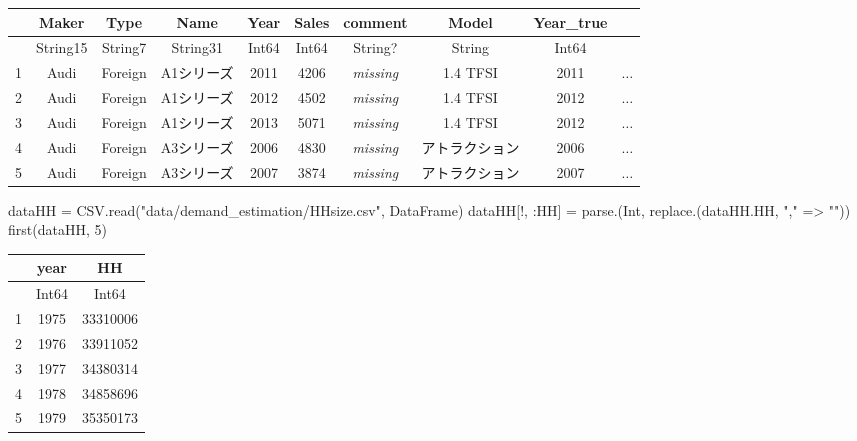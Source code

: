 \documentclass[
  letterpaper,
  DIV=11,
  numbers=noendperiod]{scrreprt}
\newenvironment{Shaded}{\begin{snugshade}}{\end{snugshade}}
\newcommand{\DataTypeTok}[1]{\textcolor[rgb]{0.68,0.00,0.00}{#1}}
\newcommand{\FloatTok}[1]{\textcolor[rgb]{0.68,0.00,0.00}{#1}}
\newcommand{\FunctionTok}[1]{\textcolor[rgb]{0.28,0.35,0.67}{#1}}
\newcommand{\NormalTok}[1]{\textcolor[rgb]{0.00,0.23,0.31}{#1}}
\newcommand{\OperatorTok}[1]{\textcolor[rgb]{0.37,0.37,0.37}{#1}}
\newcommand{\StringTok}[1]{\textcolor[rgb]{0.13,0.47,0.30}{#1}}
\begin{document}
\begin{tabular}{r|ccccccccc}
    & Maker & Type & Name & Year & Sales & comment & Model & Year\_true & \\
    \hline
    & String15 & String7 & String31 & Int64 & Int64 & String? & String & Int64 & \\
    \hline
    1 & Audi & Foreign & A1シリーズ & 2011 & 4206 & \emph{missing} & 1.4 TFSI & 2011 & $\dots$ \\
    2 & Audi & Foreign & A1シリーズ & 2012 & 4502 & \emph{missing} & 1.4 TFSI & 2012 & $\dots$ \\
    3 & Audi & Foreign & A1シリーズ & 2013 & 5071 & \emph{missing} & 1.4 TFSI & 2012 & $\dots$ \\
    4 & Audi & Foreign & A3シリーズ & 2006 & 4830 & \emph{missing} & アトラクション & 2006 & $\dots$ \\
    5 & Audi & Foreign & A3シリーズ & 2007 & 3874 & \emph{missing} & アトラクション & 2007 & $\dots$ \\
\end{tabular}

\begin{Shaded}
\begin{Highlighting}[]
\NormalTok{dataHH }\OperatorTok{=}\NormalTok{ CSV.}\FunctionTok{read}\NormalTok{(}\StringTok{"data/demand\_estimation/HHsize.csv"}\NormalTok{, DataFrame)}
\NormalTok{dataHH[!, }\OperatorTok{:}\NormalTok{HH] }\OperatorTok{=} \FunctionTok{parse}\NormalTok{.(}\DataTypeTok{Int}\NormalTok{, }\FunctionTok{replace}\NormalTok{.(dataHH.HH, }\StringTok{","} \OperatorTok{=\textgreater{}} \StringTok{""}\NormalTok{))}
\FunctionTok{first}\NormalTok{(dataHH, }\FloatTok{5}\NormalTok{)}
\end{Highlighting}
\end{Shaded}

\begin{tabular}{r|cc}
    & year & HH\\
    \hline
    & Int64 & Int64\\
    \hline
    1 & 1975 & 33310006 \\
    2 & 1976 & 33911052 \\
    3 & 1977 & 34380314 \\
    4 & 1978 & 34858696 \\
    5 & 1979 & 35350173 \\
\end{tabular}
\end{document}
